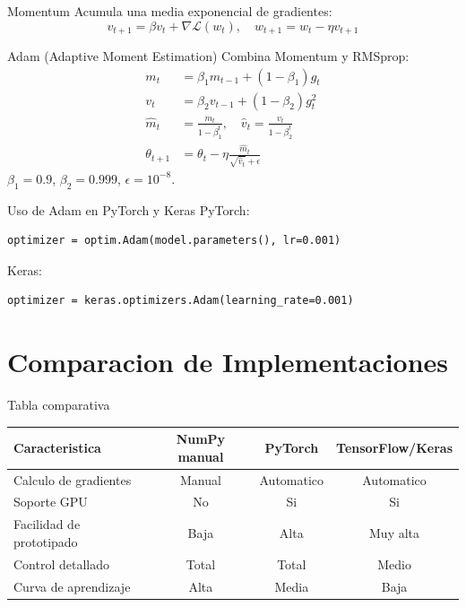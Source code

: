 \documentclass[aspectratio=169, 10pt, xcolor=table]{beamer}
\begin{document}
\begin{frame}{Momentum}
    Acumula una media exponencial de gradientes:
    \[
    v_{t+1} = \beta v_t + \nabla\mathcal{L}(w_t),\quad w_{t+1}=w_t-\eta v_{t+1}
    \]
\end{frame}

\begin{frame}{Adam (Adaptive Moment Estimation)}
    Combina Momentum y RMSprop:
    \begin{align*}
        m_t &= \beta_1 m_{t-1} + (1-\beta_1)g_t \\
        v_t &= \beta_2 v_{t-1} + (1-\beta_2)g_t^2 \\
        \hat{m}_t &= \frac{m_t}{1-\beta_1^t},\quad \hat{v}_t = \frac{v_t}{1-\beta_2^t} \\
        \theta_{t+1} &= \theta_t - \eta \frac{\hat{m}_t}{\sqrt{\hat{v}_t}+\epsilon}
    \end{align*}
    $\beta_1=0.9$, $\beta_2=0.999$, $\epsilon=10^{-8}$.
\end{frame}

\begin{frame}[fragile]{Uso de Adam en PyTorch y Keras}
    PyTorch:
    \begin{lstlisting}
optimizer = optim.Adam(model.parameters(), lr=0.001)
    \end{lstlisting}
    Keras:
    \begin{lstlisting}
optimizer = keras.optimizers.Adam(learning_rate=0.001)
    \end{lstlisting}
\end{frame}

\section{Comparacion de Implementaciones}

\begin{frame}{Tabla comparativa}
    \begin{table}
        \centering
        \begin{tabular}{l|c|c|c}
            \toprule
            Caracteristica & NumPy manual & PyTorch & TensorFlow/Keras \\
            \midrule
            Calculo de gradientes & Manual & Automatico & Automatico \\
            Soporte GPU & No & Si & Si \\
            Facilidad de prototipado & Baja & Alta & Muy alta \\
            Control detallado & Total & Total & Medio \\
            Curva de aprendizaje & Alta & Media & Baja \\
            \bottomrule
        \end{tabular}
    \end{table}
\end{frame}
\end{document}
